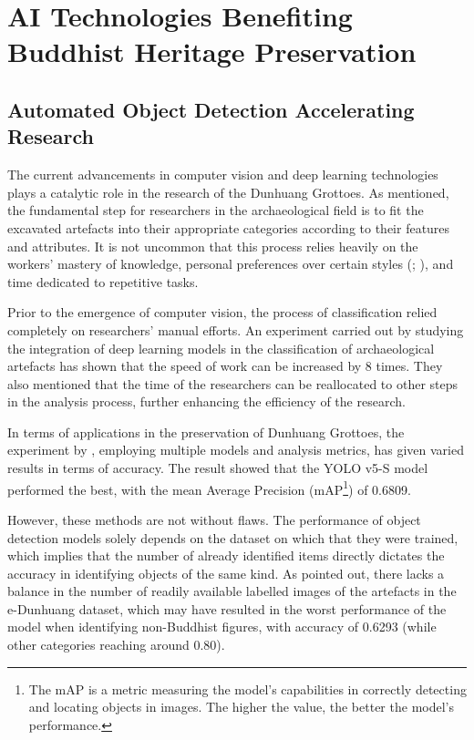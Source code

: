 \section{AI Technologies Benefiting Buddhist Heritage Preservation}

\subsection{Automated Object Detection Accelerating Research}
\label{sec:automated-object-detection}

The current advancements in computer vision and deep learning technologies plays a catalytic role in the research
of the Dunhuang Grottoes. As  mentioned, the fundamental step
for researchers in the archaeological field is to fit the excavated artefacts into their appropriate categories
according to their features and attributes. It is not uncommon that this process relies heavily on the workers'
mastery of knowledge, personal preferences over certain styles (;
), and time dedicated to repetitive tasks.

Prior to the emergence of computer vision, the process of classification relied completely on researchers'
manual efforts. An experiment carried out by  studying
the integration of deep learning models in the classification of archaeological artefacts has shown that
the speed of work can be increased by 8 times. They also mentioned that the time of the researchers can be
reallocated to other steps in the analysis process, further enhancing the efficiency of the research.

In terms of applications in the preservation of Dunhuang Grottoes, the experiment by
, employing multiple models and analysis metrics, has given varied results
in terms of accuracy. The result showed that the YOLO v5-S model performed the best, with the
mean Average Precision (mAP\footnote{
    The mAP is a metric measuring the model's capabilities in correctly detecting and locating objects in images.
    The higher the value, the better the model's performance.
}) of 0.6809.

However, these methods are not without flaws. The performance of object detection models solely depends on the
dataset on which that they were trained, which implies that the number of already identified items directly
dictates the accuracy in identifying objects of the same kind. As  pointed out,
there lacks a balance in the number of readily available labelled images of the artefacts in the e-Dunhuang
dataset, which may have resulted in the worst performance of the model when identifying non-Buddhist figures,
with accuracy of 0.6293 (while other categories reaching around 0.80).

